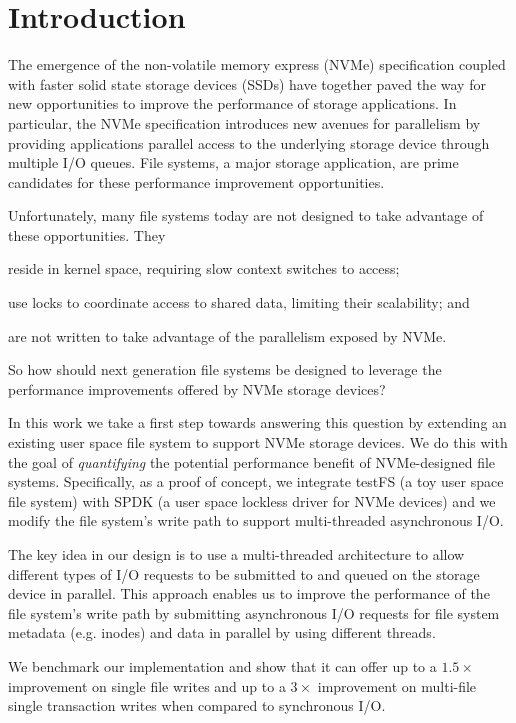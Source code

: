 \section{Introduction}
The emergence of the non-volatile memory express (NVMe) specification coupled
with faster solid state storage devices (SSDs) have together paved the way for
new opportunities to improve the performance of storage applications. In
particular, the NVMe specification introduces new avenues for parallelism by
providing applications parallel access to the underlying storage device through
multiple I/O queues. File systems, a major storage application, are prime
candidates for these performance improvement opportunities.

Unfortunately, many file systems today are not designed to take advantage of
these opportunities. They
\begin{enumerate*}[label={(\roman*)}]
  \item reside in kernel space, requiring slow context switches to access;
  \item use locks to coordinate access to shared data, limiting their
    scalability; and
  \item are not written to take advantage of the parallelism exposed by NVMe.
\end{enumerate*}
So how should next generation file systems be designed to leverage the
performance improvements offered by NVMe storage devices?

In this work we take a first step towards answering this question by extending
an existing user space file system to support NVMe storage devices. We do this
with the goal of {\it quantifying} the potential performance benefit of
NVMe-designed file systems. Specifically, as a proof of concept, we integrate
testFS (a toy user space file system) with SPDK (a user space lockless driver
for NVMe devices) and we modify the file system's write path to support
multi-threaded asynchronous I/O.

The key idea in our design is to use a multi-threaded architecture to allow
different types of I/O requests to be submitted to and queued on the storage
device in parallel. This approach enables us to improve the performance of the
file system's write path by submitting asynchronous I/O requests for file
system metadata (e.g. inodes) and data in parallel by using different threads.

We benchmark our implementation and show that it can offer up to a $1.5\times$
improvement on single file writes and up to a $3\times$ improvement on
multi-file single transaction writes when compared to synchronous I/O.

